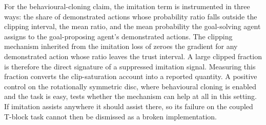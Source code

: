 For the behavioural-cloning claim, the imitation term is instrumented in three
ways: the share of demonstrated actions whose probability ratio falls outside the
clipping interval, the mean ratio, and the mean probability the goal-solving agent
assigns to the goal-proposing agent's demonstrated actions. The clipping mechanism
inherited from the imitation loss of \cite{OpenAI2021AsymmetricSF} zeroes the
gradient for any demonstrated action whose ratio leaves the trust interval. A large
clipped fraction is therefore the direct signature of a suppressed imitation
signal. Measuring this fraction converts the clip-saturation account into a
reported quantity. A positive control on the rotationally symmetric disc, where
behavioural cloning is enabled and the task is easy, tests whether the mechanism
can help at all in this setting. If imitation assists anywhere it should assist
there, so its failure on the coupled T-block task cannot then be dismissed as a
broken implementation.
